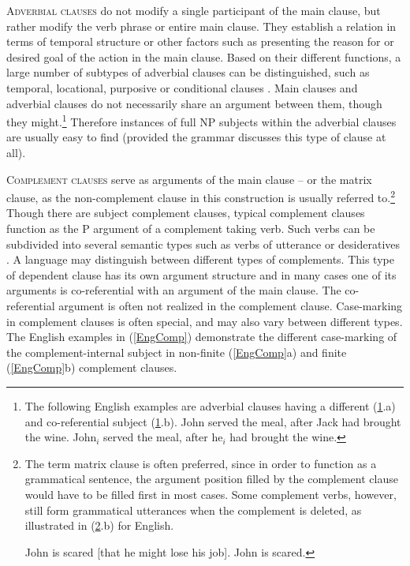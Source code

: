 \textsc{Adverbial clauses} do not modify a single participant of the main clause, but rather modify the verb phrase or entire main clause. 
They establish a relation in terms of temporal structure or other factors such as presenting the reason for or desired goal of the action in the main clause. 
Based on their different functions, a large number of subtypes of adverbial clauses can be distinguished, such as temporal, locational, purposive or conditional clauses \citep[for a discussion of these different subtypes see][243--265]{Adverbial}. 
Main clauses and adverbial clauses do not necessarily share an argument between them, though they might.\footnote{The following English examples are adverbial clauses having a different
  (\ref{EngAdvCl}.a) and co-referential subject (\ref{EngAdvCl}.b).
\eal\label{EngAdvCl}
\ex John served the meal, after Jack had brought the wine.
\ex John$_i$ served the meal, after he$_i$ had brought the wine.
\zllast
}%
Therefore instances of full NP subjects within the adverbial clauses are usually easy to find (provided the grammar discusses this type of clause at all). 

\textsc{Complement clauses} serve as arguments of the main clause -- or the matrix clause, as the non-complement clause in this construction is usually referred to.\footnote{The term matrix clause is often preferred, since in order to function as a grammatical sentence, the argument position filled by the complement clause would have to be filled first in most cases.
Some complement verbs, however, still form grammatical utterances when the complement is deleted, as illustrated in (\ref{EngComp1}.b) for English. 

\eal\label{EngComp1} 
\ex John is scared  {\rm[}that he might lose his job{\rm]}.
\ex John is scared.
\zllast
} 
Though there are subject complement clauses, typical complement clauses function as the P argument of a complement taking verb. 
Such verbs can be subdivided into several semantic types such as verbs of utterance or desideratives \citep[an extensive discussion of the different types of complement verbs can be found in][120--145]{Complement}.
A language may distinguish between different types of complements. 
This type of dependent clause has its own argument structure and in many cases one of its arguments is co-referential with an argument of the main clause. 
The co-referential argument is often not realized in the complement clause. 
Case-marking in complement clauses is often special, and may also vary between different types. 
The English examples in (\ref{EngComp}) demonstrate the different case-marking of the complement-internal subject in non-finite (\ref{EngComp}a) and finite (\ref{EngComp}b) complement clauses.

